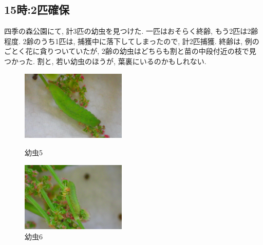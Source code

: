 \documentclass{jsarticle}
\begin{document}
\subsection{15時:2匹確保}
四季の森公園にて, 計3匹の幼虫を見つけた. 一匹はおそらく終齢, もう2匹は2齢程度. 2齢のうち1匹は, 捕獲中に落下してしまったので, 計2匹捕獲. 終齢は, 例のごとく花に貪りついていたが, 2齢の幼虫はどちらも割と苗の中段付近の枝で見つかった. 
割と, 若い幼虫のほうが, 葉裏にいるのかもしれない. 
\begin{figure}[htbp]
  \begin{minipage}{0.5\hsize}
    \begin{center}
      \includegraphics[width=5cm]{photo4/Larva5.JPG}
    \end{center}
    \caption{幼虫5}
  \end{minipage}
  \begin{minipage}{0.5\hsize}
    \begin{center}
      \includegraphics[width=5cm]{photo4/Larva6.JPG}
    \end{center}
    \caption{幼虫6}
  \end{minipage}
\end{figure}
\end{document}
